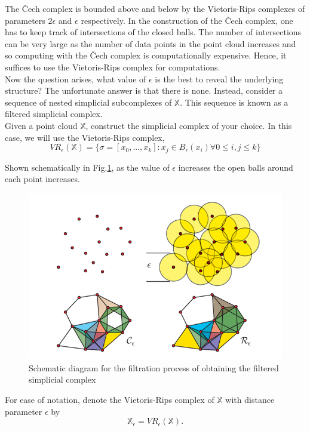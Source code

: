 \documentclass{article}
\newcommand{\be}{\begin{equation}}
\newcommand{\ee}{\end{equation}}
\begin{document}
The \v{C}ech complex is bounded above and below by the Vietoris-Rips complexes of parameters $2\epsilon$ and $\epsilon$ respectively. In the construction of the \v{C}ech complex, one has to keep track of intersections of the closed balls. The number of intersections can be very large as the number of data points in the point cloud increases and so computing with the \v{C}ech complex is computationally expensive. Hence, it suffices to use the Vietoris-Rips complex for computations.\\

Now the question arises, what value of $\epsilon$ is the best to reveal the underlying structure? The unfortunate answer is that there is none. Instead, consider a sequence of nested simplicial subcomplexes of $\mathbb{X}$. This sequence is known as a filtered simplicial complex.\\

Given a point cloud $\mathbb{X}$, construct the simplicial complex of your choice. In this case, we will use the Vietoris-Rips complex,
\be
VR_{\epsilon}(\mathbb{X}) = \{\sigma = [x_0,...,x_k] : x_j \in B_{\epsilon}(x_i)  \forall  0 \leq i,j \leq k \}
\ee

Shown schematically in Fig.\ref{fig:Filtration}, as the value of $\epsilon$ increases the open balls around each point increases.

\begin{figure}[h]
    \centering
    \includegraphics{cech and rips robert ghrist.png}
    \caption{Schematic diagram for the filtration process of obtaining the filtered simplicial complex \cite{Ghrist2007BarcodesTP}}
    \label{fig:Filtration}
\end{figure}
For ease of notation, denote the Vietoris-Rips complex of $\mathbb{X}$ with distance parameter $\epsilon$ by 
\be
\mathbb{X}_{\epsilon} = VR_{\epsilon}(\mathbb{X}).
\ee
\end{document}
